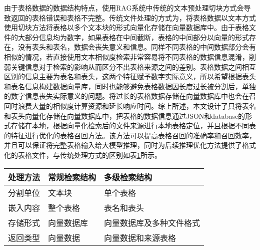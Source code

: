 由于表格数据的数据结构特点，使用RAG系统中传统的文本预处理切块方式会导致返回的表格错误和表格不完整。传统文件处理的方式为，将表格数据以文本方式使用切块方法将表格以多个文本块的形式向量化存储在向量数据库中。由于表格文件的大部分信息均为数字，如果表格在中间截断，表格的中间部分以向量的形式存在，没有表头和表名，数据会丧失意义和信息。同样不同表格的中间数据部分会有相似的情况，若直接使用文本相似度检索非常容易将不同表格的数据信息混淆，削弱关键信息对于检索的影响从而区分不出表格来源之间的差别。表格数据之间相互区别的信息主要为表名和表头，这两个特征赋予数字实际意义，所以希望根据表头和表名信息构建数据向量库，同时也能够避免表格数据因长度过长被分割后，单独的数字信息丧失实际意义的问题。将过长的表格数据存储在向量数据库中也会在召回时浪费大量的相似度计算资源和延长响应时间。综上所述，本文设计了只将表名和表头向量化存储在向量数据库中，把表格的数据信息通过JSON和database的形式存储在本地，根据向量化检索后的文件来源进行本地表格定位，并且根据不同表的特征进行优化的表格召回方法。该方法可以提高表格召回的准确率和召回效率，并且可以保证将完整表格输入给大模型推理，同时为后续推理优化方法提供了格式化的表格文件，与传统处理方式的区别如表\ref{tab:方法对比}所示。
\begin{table}[h]
    \centering
    \label{tab:方法对比}
    \begin{tabularx}{\linewidth}{@{}XXX@{}}
        \toprule[1.5pt]
        {处理方法} & {常规检索结构} & {多级检索结构} \\
        \midrule[1pt]
        分割单位 & 文本块 & 单个表格 \\
        嵌入内容 & 整个表格 & 表名和表头 \\
        存储形式 & 向量数据库 & 向量数据库及多种文件格式 \\
        返回类型 & 向量数据 & 向量数据和来源表格 \\
        \bottomrule[1.5pt]
    \end{tabularx}
\end{table}

